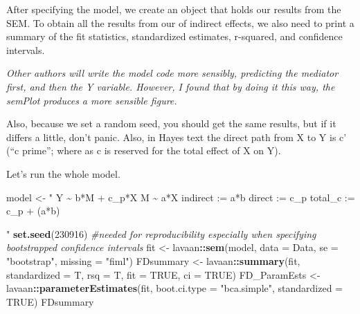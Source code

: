 \documentclass[
  11pt,
]{book}
\newenvironment{Shaded}{\begin{snugshade}}{\end{snugshade}}
\newcommand{\AttributeTok}[1]{\textcolor[rgb]{0.27,0.27,0.27}{#1}}
\newcommand{\CommentTok}[1]{\textcolor[rgb]{0.37,0.37,0.37}{\textit{#1}}}
\newcommand{\ConstantTok}[1]{\textcolor[rgb]{0.37,0.37,0.37}{#1}}
\newcommand{\DecValTok}[1]{\textcolor[rgb]{0.06,0.06,0.06}{#1}}
\newcommand{\FunctionTok}[1]{\textcolor[rgb]{0.27,0.27,0.27}{\textbf{#1}}}
\newcommand{\NormalTok}[1]{#1}
\newcommand{\OtherTok}[1]{\textcolor[rgb]{0.37,0.37,0.37}{#1}}
\newcommand{\SpecialCharTok}[1]{\textcolor[rgb]{0.43,0.43,0.43}{\textbf{#1}}}
\newcommand{\StringTok}[1]{\textcolor[rgb]{0.5,0.5,0.5}{#1}}
\begin{document}
After specifying the model, we create an object that holds our results from the SEM. To obtain all the results from our of indirect effects, we also need to print a summary of the fit statistics, standardized estimates, r-squared, and confidence intervals.

\emph{Other authors will write the model code more sensibly, predicting the mediator first, and then the Y variable. However, I found that by doing it this way, the semPlot produces a more sensible figure.}

Also, because we set a random seed, you should get the same results, but if it differs a little, don't panic. Also, in Hayes text the direct path from X to Y is c' (``c prime''; where as c is reserved for the total effect of X on Y).

Let's run the whole model.

\begin{Shaded}
\begin{Highlighting}[]
\NormalTok{model }\OtherTok{\textless{}{-}} \StringTok{"}
\StringTok{          Y \textasciitilde{} b*M + c\_p*X }
\StringTok{          M \textasciitilde{} a*X}
\StringTok{          }
\StringTok{          indirect :=  a*b}
\StringTok{          direct  := c\_p}
\StringTok{          total\_c  := c\_p + (a*b)}

\StringTok{          "}
\FunctionTok{set.seed}\NormalTok{(}\DecValTok{230916}\NormalTok{)  }\CommentTok{\#needed for reproducibility especially when specifying bootstrapped confidence intervals}
\NormalTok{fit }\OtherTok{\textless{}{-}}\NormalTok{ lavaan}\SpecialCharTok{::}\FunctionTok{sem}\NormalTok{(model, }\AttributeTok{data =}\NormalTok{ Data, }\AttributeTok{se =} \StringTok{"bootstrap"}\NormalTok{, }\AttributeTok{missing =} \StringTok{"fiml"}\NormalTok{)}
\NormalTok{FDsummary }\OtherTok{\textless{}{-}}\NormalTok{ lavaan}\SpecialCharTok{::}\FunctionTok{summary}\NormalTok{(fit, }\AttributeTok{standardized =}\NormalTok{ T, }\AttributeTok{rsq =}\NormalTok{ T, }\AttributeTok{fit =} \ConstantTok{TRUE}\NormalTok{,}
    \AttributeTok{ci =} \ConstantTok{TRUE}\NormalTok{)}
\NormalTok{FD\_ParamEsts }\OtherTok{\textless{}{-}}\NormalTok{ lavaan}\SpecialCharTok{::}\FunctionTok{parameterEstimates}\NormalTok{(fit, }\AttributeTok{boot.ci.type =} \StringTok{"bca.simple"}\NormalTok{,}
    \AttributeTok{standardized =} \ConstantTok{TRUE}\NormalTok{)}
\NormalTok{FDsummary}
\end{Highlighting}
\end{Shaded}
\end{document}
